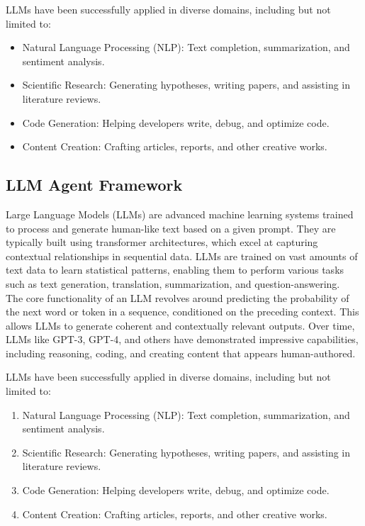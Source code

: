 LLMs have been successfully applied in diverse domains, including but not limited to:

\begin{itemize}
    \item Natural Language Processing (NLP): Text completion, summarization, and sentiment analysis.
    \item Scientific Research: Generating hypotheses, writing papers, and assisting in literature reviews.
    \item Code Generation: Helping developers write, debug, and optimize code.
    \item Content Creation: Crafting articles, reports, and other creative works.
\end{itemize}

\subsection{LLM Agent Framework}
Large Language Models (LLMs) are advanced machine learning systems trained to process and generate human-like text based on a given prompt. They are typically built using transformer architectures, which excel at capturing contextual relationships in sequential data. LLMs are trained on vast amounts of text data to learn statistical patterns, enabling them to perform various tasks such as text generation, translation, summarization, and question-answering.\\
The core functionality of an LLM revolves around predicting the probability of the next word or token in a sequence, conditioned on the preceding context. This allows LLMs to generate coherent and contextually relevant outputs. Over time, LLMs like GPT-3, GPT-4, and others have demonstrated impressive capabilities, including reasoning, coding, and creating content that appears human-authored.

LLMs have been successfully applied in diverse domains, including but not limited to:

\begin{enumerate}
    \item Natural Language Processing (NLP): Text completion, summarization, and sentiment analysis.
    \item Scientific Research: Generating hypotheses, writing papers, and assisting in literature reviews.
    \item Code Generation: Helping developers write, debug, and optimize code.
    \item Content Creation: Crafting articles, reports, and other creative works.
\end{enumerate}

